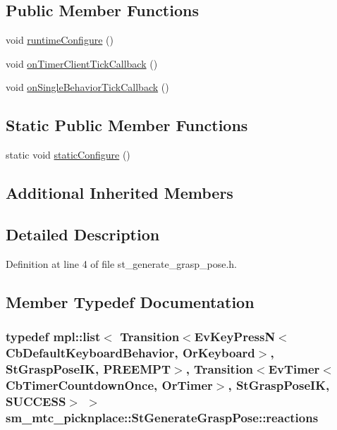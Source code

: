 \subsection*{Public Member Functions}
\begin{DoxyCompactItemize}
\item 
void \hyperlink{structsm__mtc__picknplace_1_1StGenerateGraspPose_a02d75d1e06c77e400563ebf35e15d573}{runtime\+Configure} ()
\item 
void \hyperlink{structsm__mtc__picknplace_1_1StGenerateGraspPose_a97e62141e87e1e256ac09d7af87d2a32}{on\+Timer\+Client\+Tick\+Callback} ()
\item 
void \hyperlink{structsm__mtc__picknplace_1_1StGenerateGraspPose_aa4668520cd1e81522ea715eea641d6bc}{on\+Single\+Behavior\+Tick\+Callback} ()
\end{DoxyCompactItemize}
\subsection*{Static Public Member Functions}
\begin{DoxyCompactItemize}
\item 
static void \hyperlink{structsm__mtc__picknplace_1_1StGenerateGraspPose_a14c992fc248d055735871487949d0f9f}{static\+Configure} ()
\end{DoxyCompactItemize}
\subsection*{Additional Inherited Members}


\subsection{Detailed Description}


Definition at line 4 of file st\+\_\+generate\+\_\+grasp\+\_\+pose.\+h.



\subsection{Member Typedef Documentation}
\subsubsection[{\texorpdfstring{reactions}{reactions}}]{\setlength{\rightskip}{0pt plus 5cm}typedef mpl\+::list$<$ Transition$<$Ev\+Key\+PressN$<$Cb\+Default\+Keyboard\+Behavior, {\bf Or\+Keyboard}$>$, {\bf St\+Grasp\+Pose\+IK}, {\bf P\+R\+E\+E\+M\+PT}$>$, Transition$<$Ev\+Timer$<$Cb\+Timer\+Countdown\+Once, {\bf Or\+Timer}$>$, {\bf St\+Grasp\+Pose\+IK}, {\bf S\+U\+C\+C\+E\+SS}$>$ $>$ {\bf sm\+\_\+mtc\+\_\+picknplace\+::\+St\+Generate\+Grasp\+Pose\+::reactions}}\hypertarget{structsm__mtc__picknplace_1_1StGenerateGraspPose_ac99899a845a0faae70c29ddfd7157f86}{}\label{structsm__mtc__picknplace_1_1StGenerateGraspPose_ac99899a845a0faae70c29ddfd7157f86}



